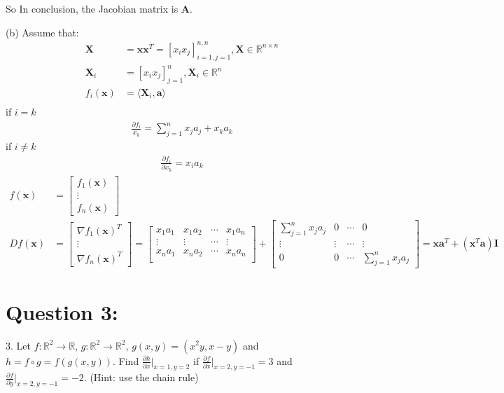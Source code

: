 \documentclass[a4paper,12pt]{article}
\newcommand{\R}{\mathbb{R}}
\begin{document}
So In conclusion, the Jacobian matrix is \(\bm{A}\).

(b) 
Assume that:
\begin{align*}
    \bm{X} &= \bm{x} \bm{x}^T= [x_i x_j]_{i = 1, j = 1}^{n, n}, \bm{X} \in \R^{n \times n} \\ 
    \bm{X}_i &= [x_ix_j]_{j=1}^n, \bm{X}_i \in \R^n\\
    f_i(\bm{x}) &= \langle \bm{X}_i, \bm{a} \rangle \\
\end{align*}
if \(i = k\)
\begin{align*}
   \frac{\partial f_i}{x_k} = \sum_{j=1}^n x_ja_j + x_ka_k
\end{align*}
if \(i \ne k\)
\begin{align*}
    \frac{\partial f_i}{\partial x_k}  = x_ia_k
\end{align*}
\begin{align*}
    f(\bm{x}) &= \begin{bmatrix}
        f_1(\bm{x}) \\
        \vdots \\
        f_n(\bm{x})
    \end{bmatrix} \\
    Df(\bm{x}) &= \begin{bmatrix}
        \nabla f_1(\bm{x})^T \\
        \vdots \\
        \nabla f_n(\bm{x})^T     
    \end{bmatrix} = 
    \begin{bmatrix}
        x_1a_1 & x_1a_2 & \cdots & x_1a_n \\
        \vdots & \vdots & \cdots & \vdots\\ 
        x_na_1 & x_na_2 & \cdots & x_na_n \\
    \end{bmatrix} + \begin{bmatrix}
        \sum_{j=1}^{n}x_ja_j & 0 & \cdots & 0 \\
        \vdots & \vdots & \cdots & \vdots\\ 
        0 & 0 & \cdots &\sum_{j=1}^{n}x_ja_j 
    \end{bmatrix} = \bm{x}\bm{a}^T + (\bm{x}^T\bm{a})\bm{I}
\end{align*}




\section*{Question 3:}
3. Let \(f : \R^2 \to \R\), \(g : \R^2 \to \R^2\), \(g(x, y) = (x^2y, x-y)\) and \(h = f \circ g = f(g(x, y))\). Find \(\frac {\partial h}{\partial x}|_{x=1, y=2}\) if
\(\frac{\partial f}{\partial x}|_{x=2, y=-1} = 3\) and \(\frac{\partial f}{\partial y}|_{x=2, y=-1} = -2\). (Hint: use the chain rule)
\end{document}
